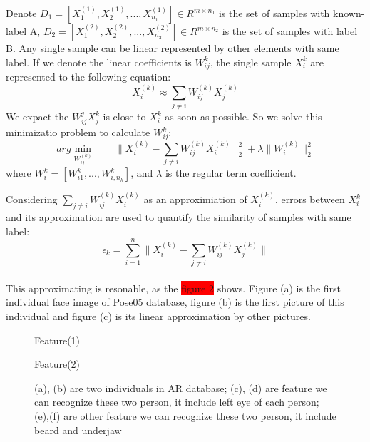 \documentclass[10pt,journal,final,twocolumn,]{IEEEtran}
\begin{document}
	Denote $D_{1}=[X_{1}^{(1)},X_{2}^{(1)},...,X_{n_{1}}^{(1)}]\in R^{m\times n_{1}}$ is the set of samples with known-label A, $D_{2}=[X_{1}^{(2)},X_{2}^{(2)},...,X_{n_{2}}^{(2)}]\in R^{m\times n_{2}}$ is the set of samples with label B. Any single sample can be linear represented by other elements with same label. If we denote the linear coefficients is $W_{ij}^{k}$, the single sample $X_{i}^{k}$ are represented to the following equation:
	\begin{equation}
	X_{i}^{(k)}\approx \sum_{j\neq i}W_{ij}^{(k)}X_{j}^{(k)}
	\end{equation}
	We expact the $W_{ij}^{j}X_{j}^{k}$ is close to $X_{i}^{k}$ as soon as possible. So we solve this minimizatio problem to calculate $W_{ij}^{k}$:
	\begin{equation}
	arg\min_{W_{ij}^{(k)}} \qquad \parallel X_{i}^{(k)}- \sum_{j \neq i} W_{ij}^{(k)}X_{i}^{(k)} \parallel_{2}^{2} + \lambda \parallel W_{i}^{(k)} \parallel_{2}^{2}
	\end{equation}
	where $W_{i}^{k}=[W_{i1}^{k}, ... , W_{i,n_{k}}^{k} ]$, and $\lambda$ is the regular term coefficient.
	
	Considering $\sum_{j \neq i} W_{ij}^{(k)}X_{i}^{(k)}$ as an approximiation of $X_{i}^{(k)}$, errors between $X_{i}^{k}$ and its approximation are used to quantify the similarity of samples with same label:
	\begin{equation}
	\epsilon_{k}=\sum_{i=1}^{n} \parallel X_{i}^{(k)}-\sum_{j \neq i} W_{ij}^{(k)}X_{j}^{(k)} \parallel 
	\end{equation} \\
	This approximating is resonable, as the {\colorbox{red}{figure 2}} shows. Figure (a) is the first individual face image of Pose05 database, figure  (b) is the first picture of this individual and figure (c) is its linear approximation by other pictures.
	
	\begin{figure}[!t]
		\centering
		\hfil	
		
		\hfil
		
		Feature(1)\\
		
		\hfil
		
		Feature(2)\\
		
		\caption{(a), (b) are two individuals in AR database; (c), (d) are feature we can recognize these two person, it include left eye of each person; (e),(f) are other feature we can recognize these two person, it include beard and underjaw}
		\label{fig 1}
	\end{figure}
	
\end{document}
